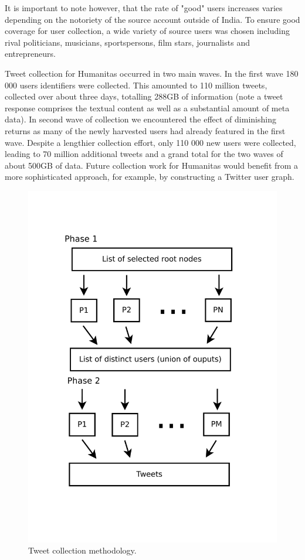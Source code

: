 It is important to note however, that the rate of "good" users increases varies depending on the notoriety of the source account outside of India. To ensure good coverage for user collection, a wide variety of source users was chosen including rival politicians, musicians, sportspersons, film stars, journalists and entrepreneurs.

Tweet collection for Humanitas occurred in two main waves. In the first wave 180 000 users identifiers were collected. This amounted to 110 million tweets, collected over about three days, totalling 288GB of information (note a tweet response comprises the textual content as well as a substantial amount of meta data). In second wave of collection we encountered the effect of diminishing returns as many of the newly harvested users had already featured in the first wave. Despite a lengthier collection effort, only 110 000 new users were collected, leading to 70 million additional tweets and a grand total for the two waves of about 500GB of data. Future collection work for Humanitas would benefit from a more sophisticated approach, for example, by constructing a Twitter user graph.

\begin{figure}
\includegraphics[width=.7\textwidth]{./img/CollectionProcess.pdf}
\caption{Tweet collection methodology.}
\label{fig:methodology}
\end{figure}

